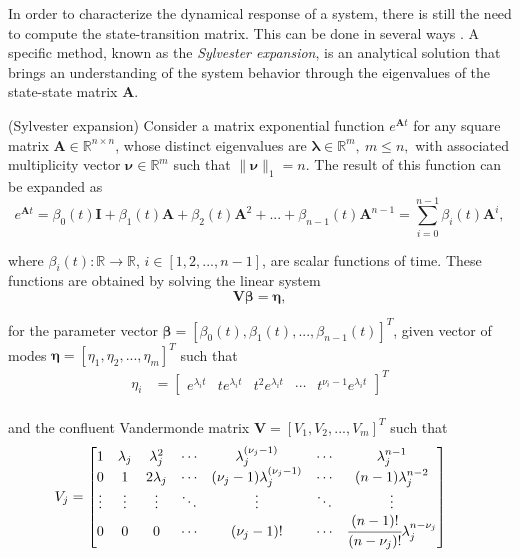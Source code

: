 \documentclass[a4paper,11pt]{book}
\numberwithin{figure}{chapter}
\numberwithin{equation}{chapter}
\numberwithin{table}{chapter}
\newtheorem{theorem}{Theorem}[chapter]
\theoremstyle{definition}
\newcounter{boxed-theorem}
\newenvironment{boxed-theorem}[1]
{\colorlet{shadecolor}{pastelBlue2!10} \begin{shaded} \begin{theorem}{#1}}
{\end{theorem} \end{shaded}}
\newcounter{boxed-definition}
\newcounter{boxed-example}
\begin{document}
In order to characterize the dynamical response of a system, there is still the need to compute the state-transition matrix. This can be done in several ways \cite{Moler_VanLoan:2003}. A specific method, known as the \textit{Sylvester expansion}, is an analytical solution that brings an understanding of the system behavior through the eigenvalues of the state-state matrix $\bm{A}$.

\begin{boxed-theorem}{(Sylvester expansion)} \label{th:sylvester01}
    Consider a matrix exponential function $e^{\bm{A} t}$ for any square matrix $\bm{A} \in \mathbb{R}^{n \times n}$, whose distinct eigenvalues are $\bm{\lambda} \in \mathbb{R}^{m},\ m \leq n,$ with associated multiplicity vector $\bm{\nu} \in \mathbb{R}^m$ such that $\| \bm{\nu} \|_1 = n$. The result of this function can be expanded as
    \begin{equation} \label{eq:sylvester01}
        e^{\bm{A} t} = \beta_0(t) \bm{I} + \beta_1(t) \bm{A} + \beta_2(t) \bm{A}^2 + ... + \beta_{n-1}(t) \bm{A}^{n-1} = \sum_{i=0}^{n-1} \beta_i(t) \bm{A}^i
    ,\end{equation} 
    
    \noindent where $\beta_i(t) : \mathbb{R} \rightarrow \mathbb{R}$, $i \in [1,2,...,n-1]$, are scalar functions of time. These functions are obtained by solving the linear system
    \begin{equation} \label{eq:sylvester02}
        \bm{V} \bm{\beta} = \bm{\eta}
    ,\end{equation} 
    
    \noindent for the parameter vector $\bm{\beta} = [\beta_0(t), \beta_1(t), ..., \beta_{n-1}(t)]^T$, given vector of modes $\bm{\eta} = [\eta_1, \eta_2, ..., \eta_m]^T$ such that
    \begin{align*}
        \eta_i & = \begin{bmatrix} e^{\lambda_i t} & te^{\lambda_i t} & t^2e^{\lambda_i t} & \cdots & t^{\nu_i-1}e^{\lambda_i t} \end{bmatrix}^T \\
    \end{align*}
    
	\noindent and the confluent Vandermonde matrix $\bm{V} = [V_1, V_2, ..., V_m]^T$ such that
    \begin{align*}
        V_j     & = \begin{bmatrix}
            1 & \lambda_j & \lambda_j^2 & \cdots & \lambda_j^{(\nu_j - 1)} & \cdots & \lambda_j^{n-1} \\
            0 & 1 & 2\lambda_j & \cdots & (\nu_j - 1) \lambda_j^{(\nu_j - 1)} & \cdots & (n-1)\lambda_j^{n-2} \\
            \vdots & \vdots & \vdots & \ddots & \vdots & \ddots & \vdots \\
            0 & 0 & 0 & \cdots & (\nu_j - 1)! & \cdots & \cfrac{(n - 1)!}{(n - \nu_j)!}\lambda_j^{n-\nu_j} \\
        \end{bmatrix}\
    \end{align*} 
\end{boxed-theorem}
\end{document}
